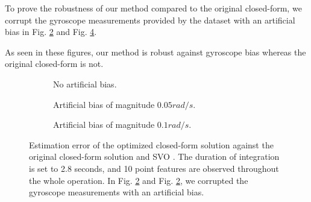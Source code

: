 \documentclass[letterpaper, 10 pt, journal, twoside]{IEEEtran}  %
\begin{document}
To prove the robustness of our method compared to the original closed-form,
we corrupt the gyroscope measurements provided by the dataset with an artificial bias in Fig. \ref{fig:validBias1} and Fig. \ref{fig:validBias2}.

As seen in these figures, our method is robust against gyroscope bias whereas the original closed-form is not.

\begin{figure}
  \centering
  \begin{subfigure}[b]{0.9\columnwidth}
   \resizebox{\columnwidth}{!}{}
    \caption{No artificial bias.\label{fig:valid}}
  \end{subfigure}
  \begin{subfigure}[b]{0.9\columnwidth}
    \resizebox{\columnwidth}{!}{}
    \caption{Artificial bias of magnitude $0.05 rad/s$.\label{fig:validBias1}}
  \end{subfigure}
  \begin{subfigure}[b]{0.9\columnwidth}
    \resizebox{\columnwidth}{!}{}
    \caption{Artificial bias of magnitude $0.1 rad/s$.\label{fig:validBias2}}
  \end{subfigure}
  \caption{Estimation error of the optimized closed-form solution against the original closed-form solution \cite{Martinelli2014} and SVO \cite{FaesslerICRA15}.
    The duration of integration is set to 2.8 seconds, and 10 point features are observed throughout the whole operation.
    In Fig. \ref{fig:validBias1} and Fig. \ref{fig:validBias1}, we corrupted the gyroscope measurements with an artificial bias.}
\end{figure}


\end{document}

